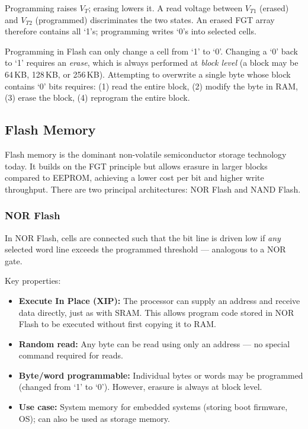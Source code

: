 \documentclass[11pt, a4paper, notitlepage]{report}
\theoremstyle{definition}
\theoremstyle{remark}
\theoremstyle{definition}
\begin{document}
\begin{keyresult}[title={Key Result: FGT Threshold Shift Encodes Data}]
  Programming raises $V_T$; erasing lowers it. A read voltage between $V_{T1}$ (erased) and $V_{T2}$ (programmed) discriminates the two states. An erased FGT array therefore contains all `1's; programming writes `0's into selected cells.
\end{keyresult}

\begin{warning}[title={Warning: Flash Can Only Clear Bits, Not Set Them Individually}]
  Programming in Flash can only change a cell from `1' to `0'. Changing a `0' back to `1' requires an \emph{erase}, which is always performed at \emph{block level} (a block may be 64\,KB, 128\,KB, or 256\,KB). Attempting to overwrite a single byte whose block contains `0' bits requires: (1) read the entire block, (2) modify the byte in RAM, (3) erase the block, (4) reprogram the entire block.
\end{warning}

\subsection{Flash Memory}
\label{sec:flash}

Flash memory is the dominant non-volatile semiconductor storage technology today. It builds on the FGT principle but allows erasure in larger blocks compared to EEPROM, achieving a lower cost per bit and higher write throughput. There are two principal architectures: NOR Flash and NAND Flash.

\subsubsection{NOR Flash}
\label{sec:nor-flash}

In NOR Flash, cells are connected such that the bit line is driven low if \emph{any} selected word line exceeds the programmed threshold — analogous to a NOR gate.

Key properties:
\begin{itemize}
  \item \textbf{Execute In Place (XIP):} The processor can supply an address and receive data directly, just as with SRAM. This allows program code stored in NOR Flash to be executed without first copying it to RAM.
  \item \textbf{Random read:} Any byte can be read using only an address — no special command required for reads.
  \item \textbf{Byte/word programmable:} Individual bytes or words may be programmed (changed from `1' to `0'). However, erasure is always at block level.
  \item \textbf{Use case:} System memory for embedded systems (storing boot firmware, OS); can also be used as storage memory.
\end{itemize}
\end{document}
